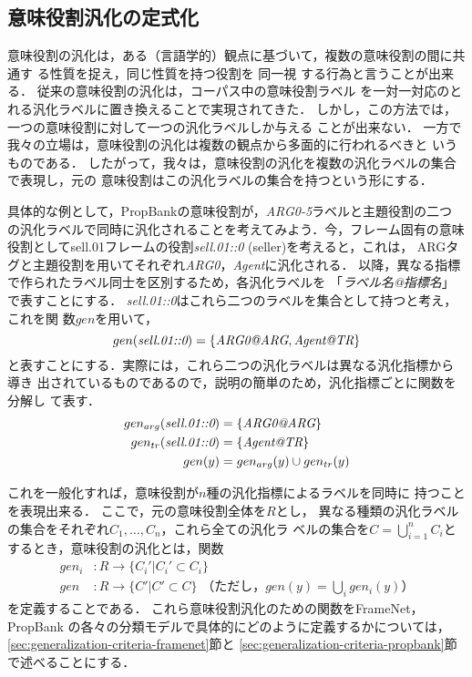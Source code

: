\documentclass[japanese]{jnlp_1.4}
\begin{document}
\subsection{意味役割汎化の定式化}
\label{sec:define-generalization}

意味役割の汎化は，ある（言語学的）観点に基づいて，複数の意味役割の間に共通す
る性質を捉え，同じ性質を持つ役割を
同一視
する行為と言うことが出来る．
従来の意味役割の汎化は，コーパス中の意味役割ラベル
を一対一対応のとれる汎化ラベルに置き換えることで実現されてきた．
しかし，この方法では，一つの意味役割に対して一つの汎化ラベルしか与える
ことが出来ない．
一方で我々の立場は，意味役割の汎化は複数の観点から多面的に行われるべきと
いうものである．
したがって，我々は，意味役割の汎化を複数の汎化ラベルの集合で表現し，元の
意味役割はこの汎化ラベルの集合を持つという形にする．

具体的な例として，PropBankの意味役割が，{\it ARG0-5}ラベルと主題役割の二つ
の汎化ラベルで同時に汎化されることを考えてみよう．今，フレーム固有の意味
役割としてsell.01フレームの役割{\it sell.01::0} (seller)を考えると，これは，
ARGタグと主題役割を用いてそれぞれ{\it ARG0}，{\it Agent}に汎化される．
以降，異なる指標で作られたラベル同士を区別するため，各汎化ラベルを
「{\it ラベル名@指標名}」で表すことにする．
{\it sell.01::0}はこれら二つのラベルを集合として持つと考え，これを関
数$gen$を用いて，
\begin{equation}
gen(\mbox{\it sell.01::0})= \{\mbox{\it ARG0@ARG}, \mbox{{\it Agent@TR}}\}
\end{equation}
と表すことにする．実際には，これら二つの汎化ラベルは異なる汎化指標から導き
出されているものであるので，説明の簡単のため，汎化指標ごとに関数を分解し
て表す．
\begin{align}
gen_{arg}(\mbox{\it sell.01::0}) & = \{\mbox{\it ARG0@ARG}\} \label{eqn:arg}\\
gen_{tr}(\mbox{\it sell.01::0}) & = \{\mbox{{\it Agent@TR}}\} \label{eqn:thematic}\\
gen(y) & =  gen_{arg}(y) \cup gen_{tr}(y)
\end{align}


これを一般化すれば，意味役割が$n$種の汎化指標によるラベルを同時に
持つことを表現出来る．
ここで，元の意味役割全体を$R$とし，
異なる種類の汎化ラベルの集合をそれぞれ$C_1, \ldots , C_n$，これら全ての汎化ラ
ベルの集合を$C= \bigcup_{i=1}^{n}C_i$とするとき，意味役割の汎化とは，関数
\begin{align}
gen_i&: R \rightarrow\{C_i'|C_i'\subset C_i\}\\
gen&: R \rightarrow\{C'|C'\subset C\}\text{ （ただし，}gen(y) =
 \bigcup_{i}gen_i(y)\text{）}
\end{align}
を定義することである．
これら意味役割汎化のための関数をFrameNet，PropBank
の各々の分類モデルで具体的にどのように定義するかについては，
\ref{sec:generalization-criteria-framenet}節と
\ref{sec:generalization-criteria-propbank}節で述べることにする．
\end{document}
